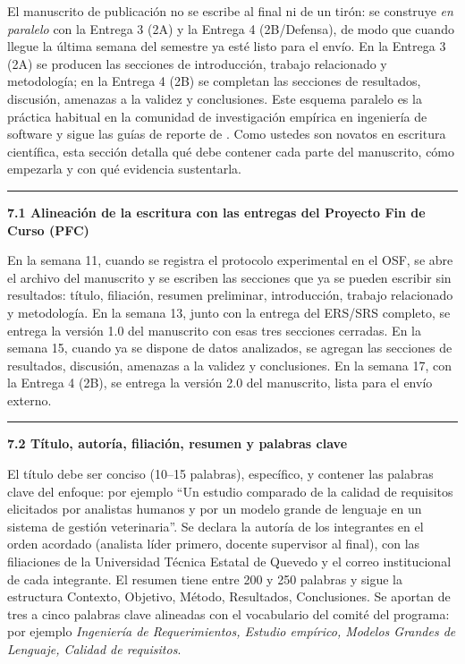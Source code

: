\documentclass[11pt,a4paper]{article}
\newcounter{secc}
\newcommand{\submark}[1]{\par\vspace{4pt}\noindent
    {\color{uteqgreen}\rule[-1pt]{3.5pt}{12pt}}\hspace{6pt}\textbf{\color{uteqgreen}#1}\par\vspace{2pt}}
\begin{document}
El manuscrito de publicación no se escribe al final ni de un tirón: se construye \emph{en paralelo} con la Entrega 3 (2A) y la Entrega 4 (2B/Defensa), de modo que cuando llegue la última semana del semestre ya esté listo para el envío.
En la Entrega 3 (2A) se producen las secciones de introducción, trabajo relacionado y metodología; en la Entrega 4 (2B) se completan las secciones de resultados, discusión, amenazas a la validez y conclusiones.
Este esquema paralelo es la práctica habitual en la comunidad de investigación empírica en ingeniería de software y sigue las guías de reporte de \cite{jedlitschka2008reporting,runeson2009guidelines,wohlin2012experimentation}.
Como ustedes son novatos en escritura científica, esta sección detalla qué debe contener cada parte del manuscrito, cómo empezarla y con qué evidencia sustentarla.

\submark{7.1 Alineación de la escritura con las entregas del Proyecto Fin de Curso (PFC)}
En la semana 11, cuando se registra el protocolo experimental en el OSF, se abre el archivo del manuscrito y se escriben las secciones que ya se pueden escribir sin resultados: título, filiación, resumen preliminar, introducción, trabajo relacionado y metodología.
En la semana 13, junto con la entrega del ERS/SRS completo, se entrega la versión 1.0 del manuscrito con esas tres secciones cerradas.
En la semana 15, cuando ya se dispone de datos analizados, se agregan las secciones de resultados, discusión, amenazas a la validez y conclusiones.
En la semana 17, con la Entrega 4 (2B), se entrega la versión 2.0 del manuscrito, lista para el envío externo.

\submark{7.2 Título, autoría, filiación, resumen y palabras clave}
El título debe ser conciso (10--15 palabras), específico, y contener las palabras clave del enfoque: por ejemplo ``Un estudio comparado de la calidad de requisitos elicitados por analistas humanos y por un modelo grande de lenguaje en un sistema de gestión veterinaria''.
Se declara la autoría de los integrantes en el orden acordado (analista líder primero, docente supervisor al final), con las filiaciones de la Universidad Técnica Estatal de Quevedo y el correo institucional de cada integrante.
El resumen tiene entre 200 y 250 palabras y sigue la estructura Contexto, Objetivo, Método, Resultados, Conclusiones.
Se aportan de tres a cinco palabras clave alineadas con el vocabulario del comité del programa: por ejemplo \emph{Ingeniería de Requerimientos, Estudio empírico, Modelos Grandes de Lenguaje, Calidad de requisitos}.
\end{document}
